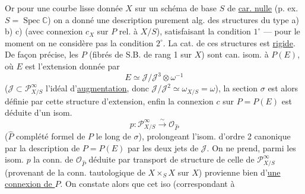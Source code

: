Or pour une courbe lisse donnée $X$ sur un schéma de base $S$ de \uline{car. nulle} (p. ex. $S=\operatorname{Spec}\mathbb C$) on a donné une description purement alg. des structures du type a) b) c) (avec connexion $c_X$ sur $P$ rel. à $X/S$), satisfaisant la condition $1^\circ$ --- pour le moment on ne considère pas la condition $2^\circ$. La cat. de ces structures est \uline{rigide}.
De façon précise, les $P$ (fibrés de S.B. de rang 1 sur $X$) sont can. isom. à $P(E)$, où $E$ est l'extension
donnée par
\[E\simeq\mathcal J/\mathcal J^3\otimes\omega^{-1}\]
($\mathcal J\subset\mathcal P^\infty_{X/S}$ l'idéal d'\uline{augmentation}, donc $\mathcal J/\mathcal J^2\simeq\omega_{X/S}=\omega$), la section $\sigma$ est alors définie par cette structure d'extension, enfin la connexion $c$ sur $P=P(E)$ est déduite d'un isom.
\[p:\mathcal P^\infty_{X/S}\xrightarrow{\sim}\mathcal O_{\widehat P}\]
($\widehat P$ complété formel de $P$ le long de $\sigma$), prolongeant l'isom. d'ordre 2 canonique   par la description de $P=P(E)$ par les deux  jets de $\mathcal J$. On ne prend, parmi les isom. $p$  la conn. de $\mathcal O_{\widehat P}$ déduite par transport de structure de celle de $\mathcal P^\infty_{X/S}$ (provenant de la conn. tautologique de $X\times_S X$ sur $X$) provienne bien d'\uline{une connexion de $P$}. On constate alors que cet iso (correspondant à
